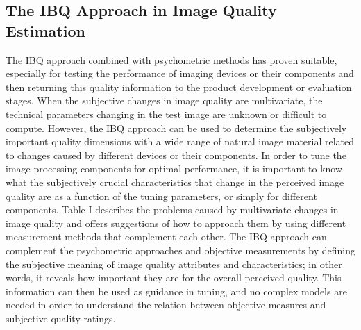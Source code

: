 \documentclass[prodmode,hillsideplop]{../acmlarge}
\begin{document}
\subsection{The IBQ Approach in Image Quality Estimation}

The IBQ approach combined with psychometric methods has proven suitable,
especially for testing the performance of imaging devices or their
components and then returning this quality information to the product
development or evaluation stages. When the subjective changes in image
quality are multivariate, the technical parameters changing in the test
image are unknown or difficult to compute. However, the IBQ approach can be
used to determine the subjectively important quality dimensions with a wide
range of natural image material related to changes caused by different
devices or their components. In order to tune the image-processing
components for optimal performance, it is important to know what the
subjectively crucial characteristics that change in the perceived image
quality are as a function of the tuning parameters, or simply for different
components. Table I describes the problems caused by multivariate changes in
image quality and offers suggestions of how to approach them by using
different measurement methods that complement each other. The IBQ approach
can complement the psychometric approaches and objective measurements by
defining the subjective meaning of image quality attributes and
characteristics; in other words, it reveals how important they are for the
overall perceived quality. This information can then be used as guidance in
tuning, and no complex models are needed in order to understand the relation
between objective measures and subjective quality ratings.
\end{document}
